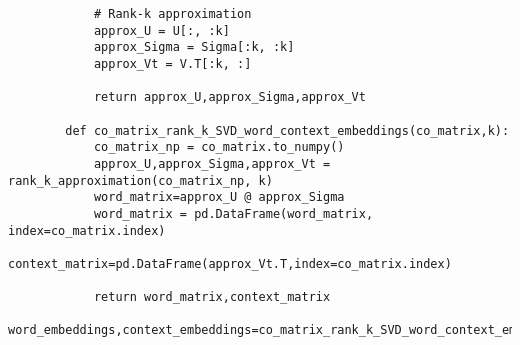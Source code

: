 \documentclass{book}
\begin{document}
\begin{itemize}
\begin{verbatim}
			# Rank-k approximation
			approx_U = U[:, :k]
			approx_Sigma = Sigma[:k, :k]
			approx_Vt = V.T[:k, :]
			
			return approx_U,approx_Sigma,approx_Vt

		def co_matrix_rank_k_SVD_word_context_embeddings(co_matrix,k):
			co_matrix_np = co_matrix.to_numpy()
			approx_U,approx_Sigma,approx_Vt = rank_k_approximation(co_matrix_np, k)
			word_matrix=approx_U @ approx_Sigma
			word_matrix = pd.DataFrame(word_matrix, index=co_matrix.index)
			context_matrix=pd.DataFrame(approx_Vt.T,index=co_matrix.index)
			
			return word_matrix,context_matrix
		word_embeddings,context_embeddings=co_matrix_rank_k_SVD_word_context_embeddings(co_matrix,20)
	\end{verbatim}
	
\end{itemize}
\end{document}
